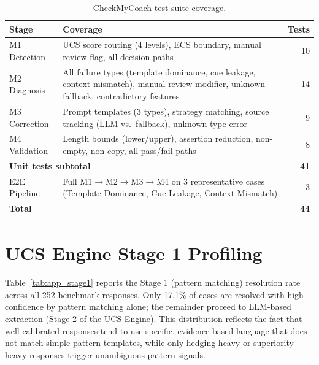\documentclass[manuscript, review, anonymous]{acmart}
\begin{document}
\begin{table}[ht]
\centering
\caption{CheckMyCoach test suite coverage.}
\label{tab:app_tests}
\begin{tabular}{lp{10cm}r}
\toprule
\textbf{Stage} & \textbf{Coverage} & \textbf{Tests} \\
\midrule
M1 Detection & UCS score routing (4 levels), ECS boundary, manual review flag, all decision paths & 10 \\
M2 Diagnosis & All failure types (template dominance, cue leakage, context mismatch), manual review modifier, unknown fallback, contradictory features & 14 \\
M3 Correction & Prompt templates (3 types), strategy matching, source tracking (LLM vs.\ fallback), unknown type error & 9 \\
M4 Validation & Length bounds (lower/upper), assertion reduction, non-empty, non-copy, all pass/fail paths & 8 \\
\midrule
\multicolumn{2}{l}{\textbf{Unit tests subtotal}} & \textbf{41} \\
\midrule
E2E Pipeline & Full M1$\rightarrow$M2$\rightarrow$M3$\rightarrow$M4 on 3 representative cases (Template Dominance, Cue Leakage, Context Mismatch) & 3 \\
\midrule
\multicolumn{2}{l}{\textbf{Total}} & \textbf{44} \\
\bottomrule
\end{tabular}
\end{table}

\section{UCS Engine Stage 1 Profiling}
\label{app:stage_profile}

Table~\ref{tab:app_stage1} reports the Stage 1 (pattern matching) resolution rate across all 252 benchmark responses. Only 17.1\% of cases are resolved with high confidence by pattern matching alone; the remainder proceed to LLM-based extraction (Stage 2 of the UCS Engine). This distribution reflects the fact that well-calibrated responses tend to use specific, evidence-based language that does not match simple pattern templates, while only hedging-heavy or superiority-heavy responses trigger unambiguous pattern signals.
\end{document}
